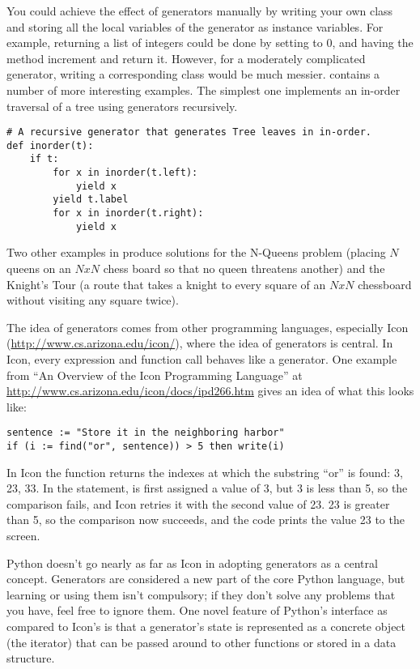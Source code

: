\documentclass{howto}
\begin{document}
You could achieve the effect of generators manually by writing your
own class and storing all the local variables of the generator as
instance variables.  For example, returning a list of integers could
be done by setting  to 0, and having the
 method increment  and return it.
However, for a moderately complicated generator, writing a
corresponding class would be much messier.
 contains a number of more
interesting examples.  The simplest one implements an in-order
traversal of a tree using generators recursively.

\begin{verbatim}
# A recursive generator that generates Tree leaves in in-order.
def inorder(t):
    if t:
        for x in inorder(t.left):
            yield x
        yield t.label
        for x in inorder(t.right):
            yield x
\end{verbatim}

Two other examples in  produce
solutions for the N-Queens problem (placing $N$ queens on an $NxN$
chess board so that no queen threatens another) and the Knight's Tour
(a route that takes a knight to every square of an $NxN$ chessboard
without visiting any square twice). 

The idea of generators comes from other programming languages,
especially Icon (\url{http://www.cs.arizona.edu/icon/}), where the
idea of generators is central.  In Icon, every
expression and function call behaves like a generator.  One example
from ``An Overview of the Icon Programming Language'' at
\url{http://www.cs.arizona.edu/icon/docs/ipd266.htm} gives an idea of
what this looks like:

\begin{verbatim}
sentence := "Store it in the neighboring harbor"
if (i := find("or", sentence)) > 5 then write(i)
\end{verbatim}

In Icon the  function returns the indexes at which the
substring ``or'' is found: 3, 23, 33.  In the  statement,
 is first assigned a value of 3, but 3 is less than 5, so the
comparison fails, and Icon retries it with the second value of 23.  23
is greater than 5, so the comparison now succeeds, and the code prints
the value 23 to the screen.

Python doesn't go nearly as far as Icon in adopting generators as a
central concept.  Generators are considered a new part of the core
Python language, but learning or using them isn't compulsory; if they
don't solve any problems that you have, feel free to ignore them.
One novel feature of Python's interface as compared to
Icon's is that a generator's state is represented as a concrete object
(the iterator) that can be passed around to other functions or stored
in a data structure.
\end{document}
